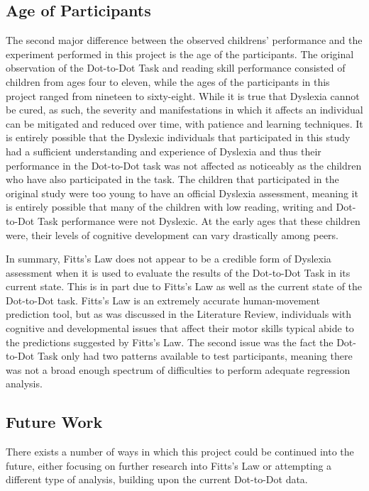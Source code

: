 	\subsection{Age of Participants}
		The second major difference between the observed childrens’ performance and the experiment performed in this project is the age of the participants. The original observation of the Dot-to-Dot Task and reading skill performance consisted of children from ages four to eleven, while the ages of the participants in this project ranged from nineteen to sixty-eight. While it is true that Dyslexia cannot be cured, as such, the severity and manifestations in which it affects an individual can be mitigated and reduced over time, with patience and learning techniques. It is entirely possible that the Dyslexic individuals that participated in this study had a sufficient understanding and experience of Dyslexia and thus their performance in the Dot-to-Dot task was not affected as noticeably as the children who have also participated in the task. The children that participated in the original study were too young to have an official Dyslexia assessment, meaning it is entirely possible that many of the children with low reading, writing and Dot-to-Dot Task performance were not Dyslexic. At the early ages that these children were, their levels of cognitive development can vary drastically among peers. 
		
		In summary, Fitts’s Law does not appear to be a credible form of Dyslexia assessment when it is used to evaluate the results of the Dot-to-Dot Task in its current state. This is in part due to Fitts’s Law as well as the current state of the Dot-to-Dot task. Fitts’s Law is an extremely accurate human-movement prediction tool, but as was discussed in the Literature Review, individuals with cognitive and developmental issues that affect their motor skills typical abide to the predictions suggested by Fitts’s Law. The second issue was the fact the Dot-to-Dot Task only had two patterns available to test participants, meaning there was not a broad enough spectrum of difficulties to perform adequate regression analysis.
		
	\subsection{Future Work}
		There exists a number of ways in which this project could be continued into the future, either focusing on further research into Fitts’s Law or attempting a different type of analysis, building upon the current Dot-to-Dot data.
		
